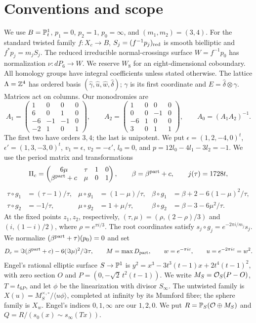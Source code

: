 \section*{Conventions and scope}
We use $B=\mathbb P^1_t$, $p_1=0$, $p_2=1$, $p_0=\infty$, and
$(m_1,m_2)=(3,4)$. For the standard twisted family $f:X_c\to B$,
$S_j=(f^{-1}p_j)_{\rm red}$ is smooth bielliptic and
$f^*p_j=m_jS_j$. The reduced irreducible normal-crossings surface
$W=f^{-1}p_0$ has normalization $\nu:dP_6\to W$. We reserve $W_8$
for an eight-dimensional coboundary. All homology groups have integral
coefficients unless stated otherwise. The lattice $\Lambda=\mathbb Z^4$ has
ordered basis $(\widehat\gamma,\widehat u,\widehat w,\widehat\delta)$;
$\gamma$ is its first coordinate and $E=\widehat\delta\otimes\gamma$.
Matrices act on columns. Our monodromies are
\[
 A_1=\begin{pmatrix}1&0&0&0\\6&0&1&0\\-6&-1&-1&0\\-2&1&0&1\end{pmatrix},\qquad
 A_2=\begin{pmatrix}1&0&0&0\\0&0&-1&0\\-6&1&0&0\\3&0&1&1\end{pmatrix},\qquad
 A_0=(A_1A_2)^{-1}.
\]
The first two have orders $3,4$; the last is unipotent. We put
$\epsilon=(1,2,-4,0)^t$, $\epsilon'=(1,3,-3,0)^t$,
$v_1=\epsilon$, $v_2=-\epsilon'$, $l_0=0$, and
$p=12l_0-4l_1-3l_2=-1$. We use the period matrix and transformations
\[
 \Pi_c=\begin{pmatrix}6\mu&\tau&1&0\\\beta^{\rm part}+c&\mu&0&1\end{pmatrix},
 \qquad \beta=\beta^{\rm part}+c,\qquad j(\tau)=1728t,
\]
\[
\begin{aligned}
 \tau\circ g_1&=(\tau-1)/\tau,&
 \mu\circ g_1&=(1-\mu)/\tau,&
 \beta\circ g_1&=\beta+2-6(1-\mu)^2/\tau,\\
 \tau\circ g_2&=-1/\tau,&
 \mu\circ g_2&=1+\mu/\tau,&
 \beta\circ g_2&=\beta-3-6\mu^2/\tau.
\end{aligned}
\]
At the fixed points $z_1,z_2$, respectively,
$(\tau,\mu)=(\rho,(2-\rho)/3)$ and $(i,(1-i)/2)$, where
$\rho=e^{\pi i/3}$. The root coordinates satisfy
$s_j\circ g_j=e^{-2\pi i/m_j}s_j$. We normalize
$(\beta^{\rm part}+\tau)(p_0)=0$ and set
\[
 D_c=\Im(\beta^{\rm part}+c)-6(\Im\mu)^2/\Im\tau,\qquad
 M=\max D_{\rm part},\qquad w=e^{-\pi i c},\qquad u=e^{-2\pi i c}=w^2.
\]
Engel's rational elliptic surface $S\to\mathbb P^1$ is
$y^2=x^3-3t^3(t-1)x+2t^4(t-1)^2$, with zero section $O$ and
$P=(0,-\sqrt2\,t^2(t-1))$. We write $M_S=\mathcal O_S(P-O)$,
$T=t_{6P}$, and let $\phi$ be the linearization with divisor $S_\infty$.
The untwisted family is
$X(u)=M_S^{\times,\circ}/\langle u\phi\rangle$, completed at infinity
by its Mumford fibre; the sphere family is $X_w$. Engel's indices
$0,1,\infty$ are our $1,2,0$. We put
$R=\mathbb P_S(\mathcal O\oplus M_S)$ and
$Q=R/(s_0(x)\sim s_\infty(Tx))$.

